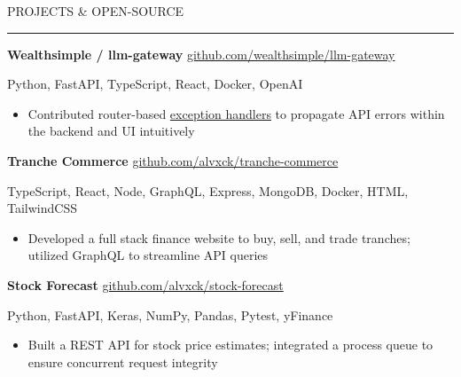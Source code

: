 \documentclass[9pt]{extarticle}
\begin{document}
\vspace{5pt}

\begin{adjustwidth}{4pt}{4pt} \large \textrm{PROJECTS \& OPEN-SOURCE} \end{adjustwidth}
\rule[8pt]{\linewidth}{0.4pt}

\begin{adjustwidth}{10pt}{10pt}
	\vspace{-5pt}

	\textcolor{imptextblack}{\textbf{\large Wealthsimple / llm-gateway}} \hfill \href{https://github.com/wealthsimple/llm-gateway}{github.com/wealthsimple/llm-gateway}
	
	Python, FastAPI, TypeScript, React, Docker, OpenAI
	
	\begin{itemize}[topsep=0pt, labelsep=10pt, leftmargin=24pt, label=\textcolor{imptextblack}{\textbullet}]
		\item Contributed router-based \href{https://github.com/wealthsimple/llm-gateway/pull/27}{exception handlers} to propagate API errors within the backend and UI intuitively
	\end{itemize}
	
	\vspace{5pt}
	\textcolor{imptextblack}{\textbf{\large Tranche Commerce}} \hfill \href{https://github.com/alvxck/tranche-commerce}{github.com/alvxck/tranche-commerce}
	
	TypeScript, React, Node, GraphQL, Express, MongoDB, Docker, HTML, TailwindCSS
	
	\begin{itemize}[topsep=0pt, labelsep=10pt, leftmargin=24pt, label=\textcolor{imptextblack}{\textbullet}]
		\item Developed a full stack finance website to buy, sell, and trade tranches; utilized \textcolor{imptextblack}{GraphQL} to streamline API queries
	\end{itemize}
	
	\vspace{5pt}
	\textcolor{imptextblack}{\textbf{\large Stock Forecast}} \hfill \href{https://github.com/alvxck/stock-forecast}{github.com/alvxck/stock-forecast}
	
	Python, FastAPI, Keras, NumPy, Pandas, Pytest, yFinance
	
	\begin{itemize}[topsep=0pt, labelsep=10pt, leftmargin=24pt, label=\textcolor{imptextblack}{\textbullet}]
		\item Built a REST API for stock price estimates; integrated a process \textcolor{imptextblack}{queue} to ensure concurrent request integrity
	\end{itemize}
\end{adjustwidth}
\end{document}
